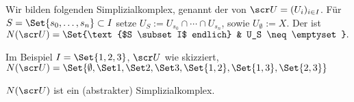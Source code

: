 Wir bilden folgenden Simplizialkomplex, genannt der  von $\scr U = (U_i)_{i \in I}$.
Für $S = \Set{s_0, \dotsc, s_n} \subset I$ setze $U_S := U_{s_0} \cap \dotsb \cap U_{s_n}$, sowie $U_{\emptyset} := X$.
Der  ist
\begin{math}
    N(\scr U) = \Set{\text{$S \subset I$ endlich} & U_S \neq \emptyset}.
\end{math}

Im Beispiel $I = \Set{1, 2, 3}$, $\scr U$ wie skizziert,
\begin{math}
    N(\scr U) = \Set{\emptyset, \Set 1, \Set 2, \Set 3, \Set{1, 2}, \Set{1, 3}, \Set{2, 3}}
\end{math}

\begin{prop}
    $N(\scr U)$ ist ein (abstrakter) Simplizialkomplex.
\end{prop}

